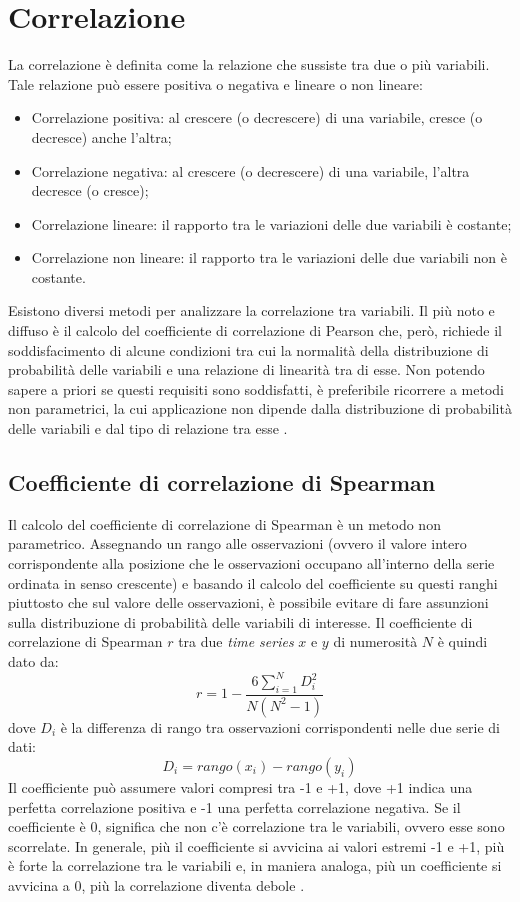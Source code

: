 \section{Correlazione}
La correlazione è definita come la relazione che sussiste tra due o più variabili. Tale relazione può essere positiva o negativa e lineare o non lineare:
\begin{itemize}
	\item Correlazione positiva: al crescere (o decrescere) di una variabile, cresce (o decresce) anche l'altra;
	\item Correlazione negativa: al crescere (o decrescere) di una variabile, l'altra decresce (o cresce);
	\item Correlazione lineare: il rapporto tra le variazioni delle due variabili è costante;
	\item Correlazione non lineare: il rapporto tra le variazioni delle due variabili non è costante.
\end{itemize} 
Esistono diversi metodi per analizzare la correlazione tra variabili. Il più noto e diffuso è il calcolo del coefficiente di correlazione di Pearson che, però, richiede il soddisfacimento di alcune condizioni tra cui la normalità della distribuzione di probabilità delle variabili e una relazione di linearità tra di esse. Non potendo sapere a priori se questi requisiti sono soddisfatti, è preferibile ricorrere a metodi non parametrici, la cui applicazione non dipende dalla distribuzione di probabilità delle variabili e dal tipo di relazione tra esse \cite{correlation}.

\subsection{Coefficiente di correlazione di Spearman}
\label{subsec:spearman}
Il calcolo del coefficiente di correlazione di Spearman è un metodo non parametrico. Assegnando un rango alle osservazioni (ovvero il valore intero corrispondente alla posizione che le osservazioni occupano all'interno della serie ordinata in senso crescente) e basando il calcolo del coefficiente su questi ranghi piuttosto che sul valore delle osservazioni, è possibile evitare di fare assunzioni sulla distribuzione di probabilità delle variabili di interesse.
Il coefficiente di correlazione di Spearman $r$ tra due \textit{time series} $x$ e $y$ di numerosità $N$ è quindi dato da:
\begin{equation}
r=1-\frac{6\sum_{i=1}^{N}D_{i}^{2}}{N(N^{2}-1)}
\end{equation}
dove $D_{i}$ è la differenza di rango tra osservazioni corrispondenti nelle due serie di dati:
\begin{equation}
D_{i}=rango(x_{i})-rango(y_{i})
\end{equation}
Il coefficiente può assumere valori compresi tra -1 e +1, dove +1 indica una perfetta correlazione positiva e -1 una perfetta correlazione negativa. Se il coefficiente è 0, significa che non c'è correlazione tra le variabili, ovvero esse sono scorrelate. In generale, più il coefficiente si avvicina ai valori estremi -1 e +1, più è forte la correlazione tra le variabili e, in maniera analoga, più un coefficiente si avvicina a 0, più la correlazione diventa debole \cite{correlation}.

